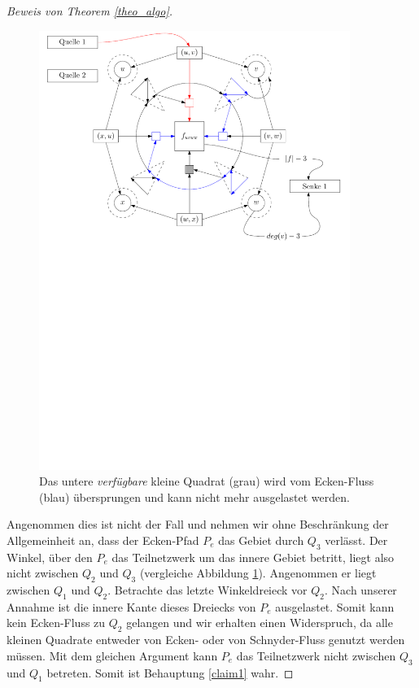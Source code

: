 \begin{proof}[Beweis von Theorem \ref{theo_algo}]
\begin{figure}
	\centering
  	\includegraphics[width=0.9\textwidth]{combined_face_skip.pdf}
  	\caption{Das untere \textit{verfügbare} kleine Quadrat (grau) wird vom Ecken-Fluss (blau) übersprungen und kann nicht mehr ausgelastet werden.}
	\label{combined_face_skip}
\end{figure}

Angenommen dies ist nicht der Fall und nehmen wir ohne Beschränkung der Allgemeinheit an, dass der Ecken-Pfad $P_e$ das Gebiet durch $Q_3$ verlässt. Der Winkel, über den $P_e$ das Teilnetzwerk um das innere Gebiet betritt, liegt also nicht zwischen $Q_2$ und $Q_3$ (vergleiche Abbildung \ref{combined_face_skip}). Angenommen er liegt zwischen $Q_1$ und $Q_2$. Betrachte das letzte Winkeldreieck vor $Q_2$. Nach unserer Annahme ist die innere Kante dieses Dreiecks von $P_e$ ausgelastet. Somit kann kein Ecken-Fluss zu $Q_2$ gelangen und wir erhalten einen Widerspruch, da alle kleinen Quadrate entweder von Ecken- oder von Schnyder-Fluss genutzt werden müssen. Mit dem gleichen Argument kann $P_e$ das Teilnetzwerk nicht zwischen $Q_3$ und $Q_1$ betreten. Somit ist Behauptung \ref{claim1} wahr.


\end{proof}

